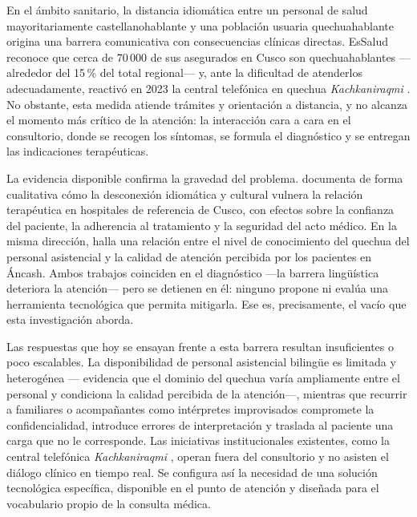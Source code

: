 \documentclass[12pt,a4paper]{article}
\begin{document}
En el {\'a}mbito sanitario, la distancia idiom{\'a}tica entre un personal de salud
mayoritariamente castellanohablante y una poblaci{\'o}n usuaria quechuahablante origina una
barrera comunicativa con consecuencias cl{\'i}nicas directas. EsSalud reconoce que cerca de
70\,000 de sus asegurados en Cusco son quechuahablantes ---alrededor del 15\,\% del total
regional--- y, ante la dificultad de atenderlos adecuadamente, reactiv{\'o} en 2023 la central
telef{\'o}nica en quechua \emph{Kachkaniraqmi} \parencite{essalud2023}. No obstante, esta medida
atiende tr{\'a}mites y orientaci{\'o}n a distancia, y no alcanza el momento m{\'a}s cr{\'i}tico de
la atenci{\'o}n: la interacci{\'o}n cara a cara en el consultorio, donde se recogen los
s{\'i}ntomas, se formula el diagn{\'o}stico y se entregan las indicaciones terap{\'e}uticas.

La evidencia disponible confirma la gravedad del problema. \textcite{begazo2026} documenta de
forma cualitativa c{\'o}mo la desconexi{\'o}n idiom{\'a}tica y cultural vulnera la relaci{\'o}n
terap{\'e}utica en hospitales de referencia de Cusco, con efectos sobre la confianza del
paciente, la adherencia al tratamiento y la seguridad del acto m{\'e}dico. En la misma
direcci{\'o}n, \textcite{cuaila2022} halla una relaci{\'o}n entre el nivel de conocimiento del
quechua del personal asistencial y la calidad de atenci{\'o}n percibida por los pacientes en
{\'A}ncash. Ambos trabajos coinciden en el diagn{\'o}stico ---la barrera ling{\"u}{\'i}stica
deteriora la atenci{\'o}n--- pero se detienen en {\'e}l: ninguno propone ni eval{\'u}a una
herramienta tecnol{\'o}gica que permita mitigarla. Ese es, precisamente, el vac{\'i}o que esta
investigaci{\'o}n aborda.

Las respuestas que hoy se ensayan frente a esta barrera resultan insuficientes o poco
escalables. La disponibilidad de personal asistencial biling{\"u}e es limitada y heterog{\'e}nea
---\textcite{cuaila2022} evidencia que el dominio del quechua var{\'i}a ampliamente entre el
personal y condiciona la calidad percibida de la atenci{\'o}n---, mientras que recurrir a
familiares o acompa{\~n}antes como int{\'e}rpretes improvisados compromete la confidencialidad,
introduce errores de interpretaci{\'o}n y traslada al paciente una carga que no le corresponde.
Las iniciativas institucionales existentes, como la central telef{\'o}nica \emph{Kachkaniraqmi}
\parencite{essalud2023}, operan fuera del consultorio y no asisten el di{\'a}logo cl{\'i}nico en
tiempo real. Se configura as{\'i} la necesidad de una soluci{\'o}n tecnol{\'o}gica espec{\'i}fica,
disponible en el punto de atenci{\'o}n y dise{\~n}ada para el vocabulario propio de la consulta
m{\'e}dica.
\end{document}
